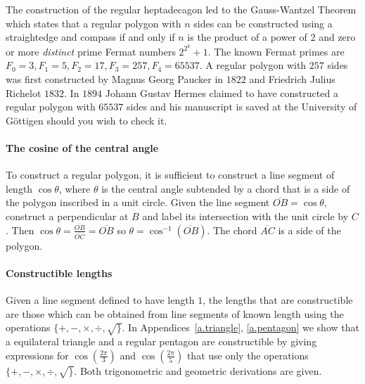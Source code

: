 \documentclass[11pt,a4paper]{article}
\newcommand*{\disfrac}[2]{\displaystyle\frac{#1}{#2}}
\begin{document}
The construction of the regular heptadecagon led to the Gauss-Wantzel Theorem which states that a regular polygon with $n$ sides can be constructed using a straightedge and compass if and only if $n$ is the product of a power of $2$ and zero or more \emph{distinct} prime Fermat numbers $2^{2^k}+1$. The known Fermat primes are $F_0=3, F_1=5, F_2=17, F_3=257, F_4=65537$. A regular polygon with $257$ sides was first constructed by Magnus Georg Paucker in $1822$ and Friedrich Julius Richelot $1832$. In $1894$ Johann Gustav Hermes claimed to have constructed a regular polygon  with $65537$ sides and his manuscript is saved at the University of G\"{o}ttigen should you wish to check it.

\paragraph{The cosine of the central angle}
To construct a regular polygon, it is sufficient to construct a line segment of length $\cos \theta$, where $\theta$ is the central angle subtended by a chord that is a side of the polygon inscribed in a unit circle. Given the line segment $\overline{OB}=\cos\theta$, construct a perpendicular at $B$ and label its intersection with the unit circle by $C$. Then $\cos \theta=\disfrac{\overline{OB}}{\overline{OC}}=\overline{OB}$ so $\theta = \cos^{-1} (\overline{OB})$. The chord $\overline{AC}$ is a side of the polygon.
\begin{center}
\end{center}

\paragraph{Constructible lengths} Given a line segment defined to have length $1$, the lengths that are constructible are those which can be obtained from line segments of known length using the operations $\{+,-,\times,\div,\surd\}$.
In Appendices~\ref{a.triangle}, \ref{a.pentagon} we show that a equilateral triangle and a regular pentagon are constructible by giving expressions for  $\cos\left(\disfrac{2\pi}{3}\right)$ and $\cos\left(\disfrac{2\pi}{5}\right)$ that use only the operations $\{+,-,\times,\div,\surd\}$. Both trigonometric and geometric derivations are given.
\end{document}
